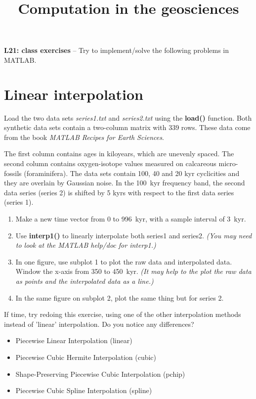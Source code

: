 \documentclass[10pt,fleqn]{article}
\title{Computation in the geosciences}
\date{\empty}
\begin{document}
\textbf{L21: class exercises} -- Try to implement/solve the following problems in MATLAB.

\section*{Linear interpolation}

Load the two data sets \textit{series1.txt} and \textit{series2.txt} using the \textbf{load()} function. Both synthetic data sets contain a two-column matrix with 339 rows. These data come from the book \textit{MATLAB Recipes for Earth Sciences}.

The first column contains ages in kiloyears, which are unevenly spaced. The second column contains oxygen-isotope values measured on calcareous micro-fossils (foraminifera). The data sets contain 100, 40 and 20 kyr cyclicities and they are overlain by Gaussian noise. In the 100~kyr frequency band, the second data series (series 2) is shifted by 5 kyrs with respect to the first data series (series 1).

\begin{enumerate}
	\item Make a new time vector from 0 to 996~kyr, with a sample interval of 3~kyr.
	\item Use \textbf{interp1()} to linearly interpolate both series1 and series2. \textit{(You may need to look at the MATLAB help/doc for interp1.)}
	\item In one figure, use subplot 1 to plot the raw data and interpolated data. Window the x-axis from 350 to 450~kyr. \textit{(It may help to the plot the raw data as points and the interpolated data as a line.)}
	\item In the same figure on subplot 2, plot the same thing but for series 2.
\end{enumerate}

If time, try redoing this exercise, using one of the other interpolation methods instead of 'linear' interpolation. Do you notice any differences?

\begin{itemize}
  \item Piecewise Linear Interpolation (linear)
  \item Piecewise Cubic Hermite Interpolation (cubic)
  \item Shape-Preserving Piecewise Cubic Interpolation (pchip)
  \item Piecewise Cubic Spline Interpolation (spline)
\end{itemize}
\end{document}
